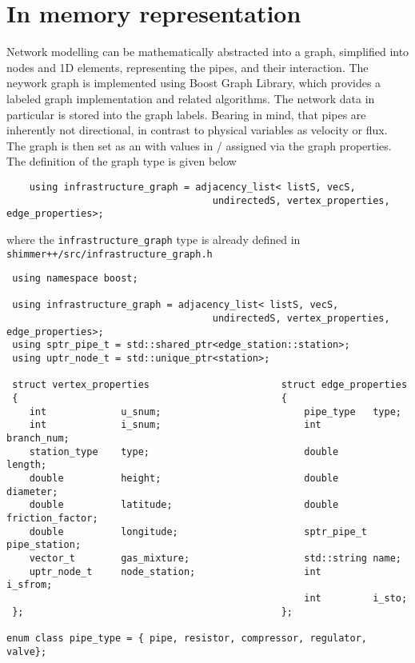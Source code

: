 \section{In memory representation}
Network modelling can be mathematically abstracted into a graph, simplified into nodes and 1D elements, representing the pipes, and their interaction. The neywork graph is implemented using Boost Graph Library, which provides a labeled graph implementation and related algorithms. The network data in particular is stored into the graph labels. Bearing in mind, that pipes are inherently not directional, in contrast to physical variables as velocity or flux. The graph is then set as an  with values in / assigned via the graph properties. The definition of the graph type is given below
\begin{verbatim}
    using infrastructure_graph = adjacency_list< listS, vecS,
                                    undirectedS, vertex_properties, edge_properties>;    
\end{verbatim}    
where the \texttt{infrastructure\_graph} type is already defined in \texttt{shimmer++/src/infrastructure\_graph.h} 
\begin{verbatim}
 using namespace boost;

 using infrastructure_graph = adjacency_list< listS, vecS,
                                    undirectedS, vertex_properties, edge_properties>;
 using sptr_pipe_t = std::shared_ptr<edge_station::station>; 
 using uptr_node_t = std::unique_ptr<station>;
 
 struct vertex_properties                       struct edge_properties 
 {                                              {
    int             u_snum;                         pipe_type   type;
    int             i_snum;                         int         branch_num;
    station_type    type;                           double      length;
    double          height;                         double      diameter;
    double          latitude;                       double      friction_factor;
    double          longitude;                      sptr_pipe_t pipe_station;
    vector_t        gas_mixture;                    std::string name;
    uptr_node_t     node_station;                   int         i_sfrom;
                                                    int         i_sto;            
 };                                             };  

enum class pipe_type = { pipe, resistor, compressor, regulator,  valve};
\end{verbatim}


